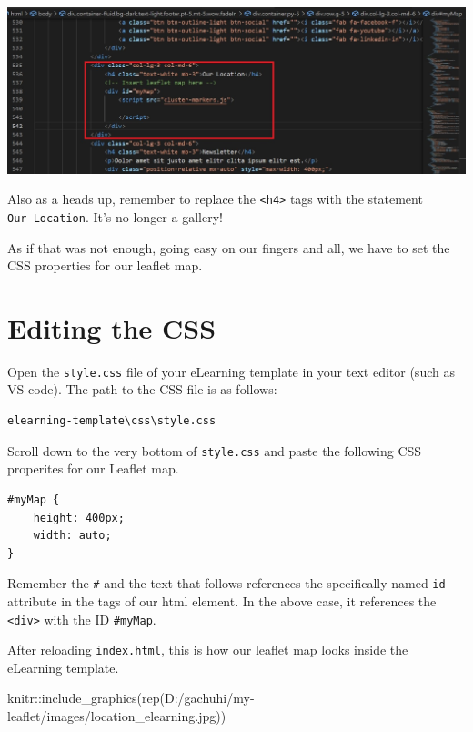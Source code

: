 \documentclass[
]{book}
\newenvironment{Shaded}{\begin{snugshade}}{\end{snugshade}}
\newcommand{\FunctionTok}[1]{\textcolor[rgb]{0.00,0.00,0.00}{#1}}
\newcommand{\NormalTok}[1]{#1}
\newcommand{\SpecialCharTok}[1]{\textcolor[rgb]{0.00,0.00,0.00}{#1}}
\newcommand{\StringTok}[1]{\textcolor[rgb]{0.31,0.60,0.02}{#1}}
\begin{document}
\includegraphics[width=20.99in]{../images/div_replace}

Also as a heads up, remember to replace the \texttt{\textless{}h4\textgreater{}} tags with the statement \texttt{Our\ Location}. It's no longer a gallery!

As if that was not enough, going easy on our fingers and all, we have to set the CSS properties for our leaflet map.

\hypertarget{editing-the-css}{%
\section{Editing the CSS}\label{editing-the-css}}

Open the \texttt{style.css} file of your eLearning template in your text editor (such as VS code). The path to the CSS file is as follows:

\begin{verbatim}
elearning-template\css\style.css
\end{verbatim}

Scroll down to the very bottom of \texttt{style.css} and paste the following CSS properites for our Leaflet map.

\begin{verbatim}
#myMap { 
    height: 400px;
    width: auto; 
}
\end{verbatim}

Remember the \texttt{\#} and the text that follows references the specifically named \texttt{id} attribute in the tags of our html element. In the above case, it references the \texttt{\textless{}div\textgreater{}} with the ID \texttt{\#myMap}.

After reloading \texttt{index.html}, this is how our leaflet map looks inside the eLearning template.

\begin{Shaded}
\begin{Highlighting}[]
\NormalTok{knitr}\SpecialCharTok{::}\FunctionTok{include\_graphics}\NormalTok{(}\FunctionTok{rep}\NormalTok{(}\StringTok{\textquotesingle{}D:/gachuhi/my{-}leaflet/images/location\_elearning.jpg\textquotesingle{}}\NormalTok{))}
\end{Highlighting}
\end{Shaded}
\end{document}
